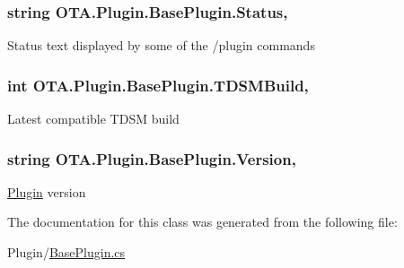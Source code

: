 \subsubsection[{Status}]{\setlength{\rightskip}{0pt plus 5cm}string O\+T\+A.\+Plugin.\+Base\+Plugin.\+Status\hspace{0.3cm}{\ttfamily [get]}, {\ttfamily [set]}}\label{class_o_t_a_1_1_plugin_1_1_base_plugin_a4d1e8d62e6d29cbb64146e5aa8b1c408}


Status text displayed by some of the /plugin commands 

\hypertarget{class_o_t_a_1_1_plugin_1_1_base_plugin_ad4d8466484faae77cf2f1999e0626686}{}
\subsubsection[{T\+D\+S\+M\+Build}]{\setlength{\rightskip}{0pt plus 5cm}int O\+T\+A.\+Plugin.\+Base\+Plugin.\+T\+D\+S\+M\+Build\hspace{0.3cm}{\ttfamily [get]}, {\ttfamily [set]}}\label{class_o_t_a_1_1_plugin_1_1_base_plugin_ad4d8466484faae77cf2f1999e0626686}


Latest compatible T\+D\+S\+M build 

\hypertarget{class_o_t_a_1_1_plugin_1_1_base_plugin_a3830fbc5a8062379ac4bde202cd6602a}{}
\subsubsection[{Version}]{\setlength{\rightskip}{0pt plus 5cm}string O\+T\+A.\+Plugin.\+Base\+Plugin.\+Version\hspace{0.3cm}{\ttfamily [get]}, {\ttfamily [set]}}\label{class_o_t_a_1_1_plugin_1_1_base_plugin_a3830fbc5a8062379ac4bde202cd6602a}


\hyperlink{namespace_o_t_a_1_1_plugin}{Plugin} version 



The documentation for this class was generated from the following file\+:\begin{DoxyCompactItemize}
\item 
Plugin/\hyperlink{_base_plugin_8cs}{Base\+Plugin.\+cs}\end{DoxyCompactItemize}
